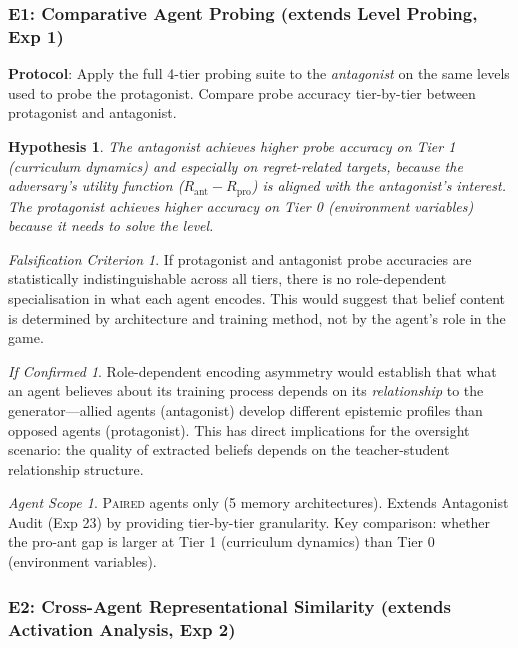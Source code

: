 \documentclass[11pt,a4paper]{article}
\newtheorem{hypothesis}{Hypothesis}[subsection]
\theoremstyle{remark}
\newtheorem*{falsification}{Falsification Criterion}
\newtheorem*{implication}{If Confirmed}
\newtheorem*{agentscope}{Agent Scope}
\newcommand{\paired}{\textsc{Paired}}
\newcommand{\Rpro}{R_{\text{pro}}}
\newcommand{\Rant}{R_{\text{ant}}}
\begin{document}
\subsubsection{E1: Comparative Agent Probing (extends Level Probing, Exp 1)}
\label{exp:e1}

\textbf{Protocol}: Apply the full 4-tier probing suite to the \textit{antagonist} on the same levels used to probe the protagonist. Compare probe accuracy tier-by-tier between protagonist and antagonist.

\begin{hypothesis}
The antagonist achieves higher probe accuracy on Tier 1 (curriculum dynamics) and especially on regret-related targets, because the adversary's utility function ($\Rant - \Rpro$) is aligned with the antagonist's interest. The protagonist achieves higher accuracy on Tier 0 (environment variables) because it needs to solve the level.
\end{hypothesis}

\begin{falsification}
If protagonist and antagonist probe accuracies are statistically indistinguishable across all tiers, there is no role-dependent specialisation in what each agent encodes. This would suggest that belief content is determined by architecture and training method, not by the agent's role in the game.
\end{falsification}

\begin{implication}
Role-dependent encoding asymmetry would establish that what an agent believes about its training process depends on its \textit{relationship} to the generator---allied agents (antagonist) develop different epistemic profiles than opposed agents (protagonist). This has direct implications for the oversight scenario: the quality of extracted beliefs depends on the teacher-student relationship structure.
\end{implication}

\begin{agentscope}
\paired{} agents only (5 memory architectures). Extends Antagonist Audit (Exp 23) by providing tier-by-tier granularity. Key comparison: whether the pro-ant gap is larger at Tier 1 (curriculum dynamics) than Tier 0 (environment variables).
\end{agentscope}

\subsubsection{E2: Cross-Agent Representational Similarity (extends Activation Analysis, Exp 2)}
\label{exp:e2}
\end{document}
